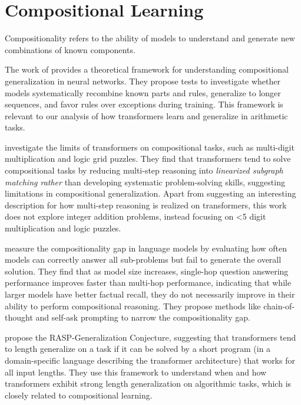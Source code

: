 \section{Compositional Learning}\label{sec:sota_compositional_learning}

Compositionality refers to the ability of models to understand and generate new combinations of known components.

The work of \cite{hupkes_compositionality_2020} provides a theoretical framework for understanding compositional generalization in neural networks. They propose tests to investigate whether models systematically recombine known parts and rules, generalize to longer sequences, and favor rules over exceptions during training. This framework is relevant to our analysis of how transformers learn and generalize in arithmetic tasks.

\cite{dziri_faith_2023} investigate the limits of transformers on compositional tasks, such as multi-digit multiplication and logic grid puzzles. They find that transformers tend to solve compositional tasks by reducing multi-step reasoning into \emph{linearized subgraph matching rather} than developing systematic problem-solving skills, suggesting limitations in compositional generalization. Apart from suggesting an interesting description for how multi-step reasoning is realized on transformers, this work does not explore integer addition problems, instead focusing on <5 digit multiplication and logic puzzles.

\cite{press_measuring_2023} measure the compositionality gap in language models by evaluating how often models can correctly answer all sub-problems but fail to generate the overall solution. They find that as model size increases, single-hop question answering performance improves faster than multi-hop performance, indicating that while larger models have better factual recall, they do not necessarily improve in their ability to perform compositional reasoning. They propose methods like chain-of-thought and self-ask prompting to narrow the compositionality gap.

\cite{zhou_what_2023} propose the RASP-Generalization Conjecture, suggesting that transformers tend to length generalize on a task if it can be solved by a short program (in a domain-specific language describing the transformer architecture) that works for all input lengths. They use this framework to understand when and how transformers exhibit strong length generalization on algorithmic tasks, which is closely related to compositional learning.

